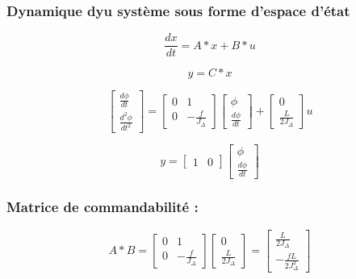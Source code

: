 \subsubsection{Dynamique dyu système sous forme d'espace d'état}


\begin{equation}
	\frac{dx}{dt} = A * x + B * u
\end{equation}

\begin{equation}
	y = C * x
\end{equation}

\begin{equation}
	\begin{bmatrix}
		\frac{d\phi}{dt} \\
		\frac{d^2\phi}{dt^2}
	\end{bmatrix}
	=
	\begin{bmatrix}
		0 & 1 \\
		0 & -\frac{f}{J_\Delta}
	\end{bmatrix}
	\begin{bmatrix}
		\phi \\
		\frac{d\phi}{dt}
	\end{bmatrix}
	+
	\begin{bmatrix}
		0 \\
		\frac{L}{2J_\Delta}
	\end{bmatrix}
	u
\end{equation}

\begin{equation}
	y = \begin{bmatrix}
		1 & 0
	\end{bmatrix}
	\begin{bmatrix}
		\phi \\
		\frac{d\phi}{dt}
	\end{bmatrix}
\end{equation}

\subsubsection{Matrice de commandabilité :}

\begin{equation}
	A * B = \begin{bmatrix}
		0 & 1 \\
		0 & -\frac{f}{J_\Delta}
	\end{bmatrix}
	\begin{bmatrix}
		0 \\
		\frac{L}{2J_\Delta}
	\end{bmatrix}
	=
	\begin{bmatrix}
		\frac{L}{2J_\Delta} \\
		-\frac{fL}{2J_\Delta^2}
	\end{bmatrix}
\end{equation}

